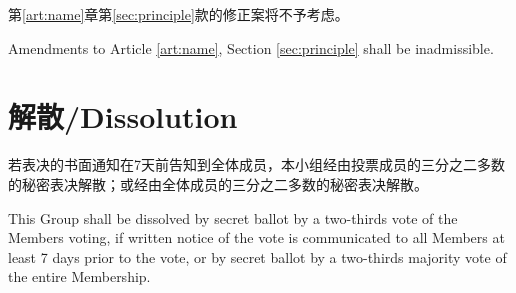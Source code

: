 \documentclass[12pt]{aspasia-constitution}
\begin{document}
	第\ref{art:name}章第\ref{sec:principle}款的修正案将不予考虑。
	
	Amendments to Article \ref{art:name}, Section \ref{sec:principle} shall be inadmissible.
	
	\section{解散/Dissolution} \label{sec:dissolution}
	
	若表决的书面通知在7天前告知到全体成员，本小组经由投票成员的三分之二多数的秘密表决解散；或经由全体成员的三分之二多数的秘密表决解散。
	
	This Group shall be dissolved by secret ballot by a two-thirds vote of the Members voting, if written notice of the vote is communicated to all Members at least 7 days prior to the vote, or by secret ballot by a two-thirds majority vote of the entire Membership.
	
	\backmatter
\end{document}

